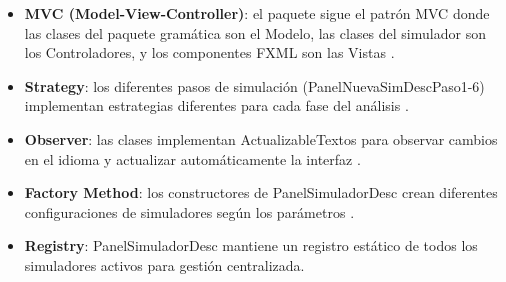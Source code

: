 \begin{itemize}
    \item \textbf{MVC (Model-View-Controller)}: el paquete sigue el patrón MVC donde las clases del paquete gramática son el Modelo, las clases del simulador son los Controladores, y los componentes FXML son las Vistas \cite{burbeck1992applications}.
    \item \textbf{Strategy}: los diferentes pasos de simulación (PanelNuevaSimDescPaso1-6) implementan estrategias diferentes para cada fase del análisis \cite{gamma1995design}.
    \item \textbf{Observer}: las clases implementan ActualizableTextos para observar cambios en el idioma y actualizar automáticamente la interfaz \cite{gamma1995design}.
    \item \textbf{Factory Method}: los constructores de PanelSimuladorDesc crean diferentes configuraciones de simuladores según los parámetros \cite{gamma1995design}.
    \item \textbf{Registry}: PanelSimuladorDesc mantiene un registro estático de todos los simuladores activos para gestión centralizada.
\end{itemize}
